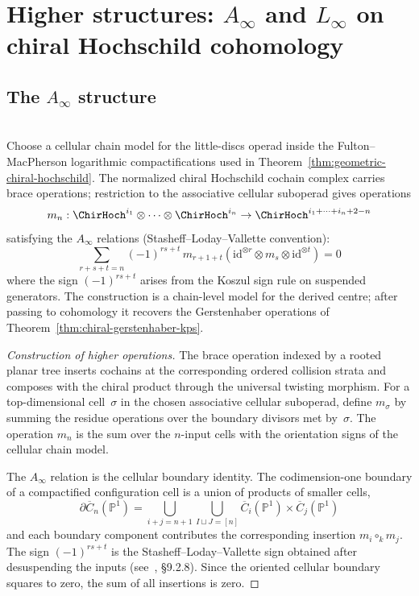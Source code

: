 \section{\texorpdfstring{Higher structures: $A_\infty$ and $L_\infty$ on chiral Hochschild cohomology}{Higher structures: A-infinity and L-infinity on chiral Hochschild cohomology}}

\subsection{\texorpdfstring{The $A_\infty$ structure}{The A-infinity structure}}

\begin{theorem}
\label{thm:ainfty-chiral-hochschild}
\leavevmode\\
Choose a cellular chain model for the little-discs operad inside the
Fulton--MacPherson logarithmic compactifications used in
Theorem~\textup{\ref{thm:geometric-chiral-hochschild}}.  The
normalized chiral Hochschild cochain complex carries brace
operations; restriction to the associative cellular suboperad gives
operations
\[
m_n: \ChirHoch^{i_1} \otimes \cdots \otimes \ChirHoch^{i_n} \to \ChirHoch^{i_1 + \cdots + i_n + 2 - n}
\]
satisfying the $A_\infty$ relations (Stasheff--Loday--Vallette convention):
\[
\sum_{r+s+t=n} (-1)^{rs+t}\, m_{r+1+t}(\mathrm{id}^{\otimes r} \otimes m_s \otimes \mathrm{id}^{\otimes t}) = 0
\]
where the sign $(-1)^{rs+t}$ arises from the Koszul sign rule on
suspended generators.  The construction is a chain-level model for
the derived centre; after passing to cohomology it recovers the
Gerstenhaber operations of
Theorem~\textup{\ref{thm:chiral-gerstenhaber-kps}}.
\end{theorem}

\begin{proof}[Construction of higher operations]
The brace operation indexed by a rooted planar tree inserts
cochains at the corresponding ordered collision strata and composes
with the chiral product through the universal twisting morphism.
For a top-dimensional cell~$\sigma$ in the chosen associative
cellular suboperad, define $m_\sigma$ by summing the residue
operations over the boundary divisors met by~$\sigma$.  The operation
$m_n$ is the sum over the $n$-input cells with the orientation signs
of the cellular chain model.

The $A_\infty$ relation is the cellular boundary identity.  The
codimension-one boundary of a compactified configuration cell is a
union of products of smaller cells,
\[
\partial \overline{C}_n(\mathbb{P}^1) = \bigcup_{i+j=n+1} \bigcup_{I \sqcup J = [n]} \overline{C}_i(\mathbb{P}^1) \times \overline{C}_j(\mathbb{P}^1)
\]
and each boundary component contributes the corresponding insertion
$m_i\circ_k m_j$.  The sign $(-1)^{rs+t}$ is the
Stasheff--Loday--Vallette sign obtained after desuspending the
inputs (see~\cite{LV12}, \S9.2.8).  Since the oriented cellular
boundary squares to zero, the sum of all insertions is zero. \qedhere
\end{proof}

